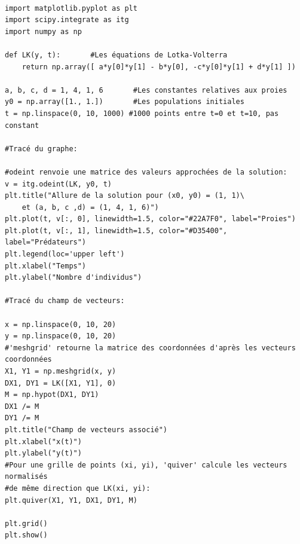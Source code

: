\documentclass[11pt]{article}
\begin{document}
\begin{verbatim}

import matplotlib.pyplot as plt
import scipy.integrate as itg
import numpy as np

def LK(y, t):       #Les équations de Lotka-Volterra
    return np.array([ a*y[0]*y[1] - b*y[0], -c*y[0]*y[1] + d*y[1] ])

a, b, c, d = 1, 4, 1, 6       #Les constantes relatives aux proies
y0 = np.array([1., 1.])       #Les populations initiales
t = np.linspace(0, 10, 1000) #1000 points entre t=0 et t=10, pas constant

#Tracé du graphe:

#odeint renvoie une matrice des valeurs approchées de la solution:
v = itg.odeint(LK, y0, t)    
plt.title("Allure de la solution pour (x0, y0) = (1, 1)\
    et (a, b, c ,d) = (1, 4, 1, 6)")
plt.plot(t, v[:, 0], linewidth=1.5, color="#22A7F0", label="Proies")
plt.plot(t, v[:, 1], linewidth=1.5, color="#D35400", label="Prédateurs")
plt.legend(loc='upper left')
plt.xlabel("Temps")
plt.ylabel("Nombre d'individus")
    
#Tracé du champ de vecteurs:

x = np.linspace(0, 10, 20)
y = np.linspace(0, 10, 20)
#'meshgrid' retourne la matrice des coordonnées d'après les vecteurs coordonnées
X1, Y1 = np.meshgrid(x, y)
DX1, DY1 = LK([X1, Y1], 0)
M = np.hypot(DX1, DY1)
DX1 /= M
DY1 /= M
plt.title("Champ de vecteurs associé")
plt.xlabel("x(t)")
plt.ylabel("y(t)")
#Pour une grille de points (xi, yi), 'quiver' calcule les vecteurs normalisés
#de même direction que LK(xi, yi):
plt.quiver(X1, Y1, DX1, DY1, M)

plt.grid()
plt.show()

\end{verbatim}
\end{document}
